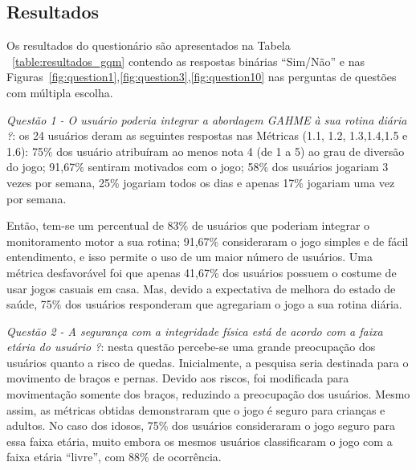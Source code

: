 \subsection{Resultados}
Os resultados do questionário são apresentados na Tabela ~\ref{table:resultados_gqm} contendo as respostas binárias ``Sim/Não'' e nas Figuras~\ref{fig:question1},\ref{fig:question3},\ref{fig:question10} nas perguntas de questões com múltipla escolha.

\textit{Questão 1 - O usuário poderia integrar a abordagem GAHME à sua rotina diária ?}: os 24 usuários deram as seguintes respostas nas Métricas (1.1, 1.2, 1.3,1.4,1.5 e 1.6): 75\% dos usuário atribuíram ao menos nota 4 (de 1 a 5) ao grau de diversão do jogo; 91,67\% sentiram motivados com o jogo; 58\% dos usuários jogariam 3 vezes por semana, 25\% jogariam todos os dias e apenas 17\% jogariam uma vez por semana. 

Então, tem-se um percentual de 83\% de usuários que poderiam integrar o monitoramento motor a sua rotina; 91,67\% consideraram o jogo simples e de fácil entendimento, e isso permite o uso de um maior número de usuários. Uma métrica desfavorável foi que apenas 41,67\% dos usuários possuem o costume de usar jogos casuais em casa. Mas, devido a expectativa de melhora do estado de saúde, 75\% dos usuários responderam que agregariam o jogo a sua rotina diária.

\textit{Questão 2 - A segurança com a integridade física está de acordo com a faixa etária do usuário
?}: nesta questão percebe-se uma grande preocupação dos usuários quanto a risco de quedas. Inicialmente, a pesquisa seria destinada para o movimento de braços e pernas. Devido aos riscos, foi modificada para movimentação somente dos braços, reduzindo a preocupação dos usuários. Mesmo assim, as métricas obtidas demonstraram que o jogo é seguro para crianças e adultos. No caso dos idosos, 75\% dos usuários consideraram o jogo seguro para essa faixa etária, muito embora os mesmos usuários classificaram o jogo com a faixa etária ``livre'', com 88\% de ocorrência.


